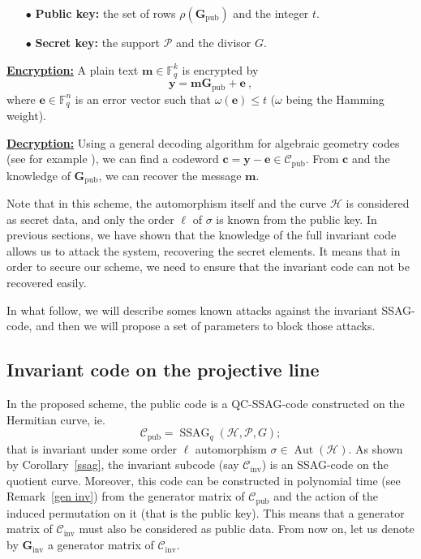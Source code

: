 \documentclass[10pt]{article}
\theoremstyle{definition}
\theoremstyle{definition}
\theoremstyle{definition}
\newcommand{\s}{\vspace{0.3cm}}
\newcommand{\C}{\mathcal{C}}
\newcommand{\fq}{\mathbb{F}_q}
\newcommand{\w}{\omega}
\newcommand{\PR}{\mathcal{P}}
\newcommand{\Aut}{\operatorname{Aut}}
\newcommand{\ssag}{\operatorname{SSAG}}
\begin{document}
\begin{enumerate}
\item[$\bullet$] \textbf{Public key:} the set of rows $\rho(\mathbf{G}_{\mathrm{pub}})$ and the integer $t$.
\item[$\bullet$] \textbf{Secret key:} the support $\PR$ and the divisor $G$.
\end{enumerate}

\s

\underline{\textbf{Encryption:}} A plain text $\mathbf{m} \in \fq^k$ is encrypted by 
\[ \mathbf{y}  = \mathbf{m}\mathbf{G}_{\mathrm{pub}} + \mathbf{e} \ ,\]
where $\mathbf{e} \in \fq^n$ is an error vector such that $\w(\mathbf{e}) \leq t$ ($\w$ being the Hamming weight).

\s

\underline{\textbf{Decryption:}} Using a general decoding algorithm for algebraic geometry codes (see for example \cite{THRP}), we can find a codeword $\mathbf{c} = \mathbf{y} - \mathbf{e} \in \mathcal{C}_{\mathrm{pub}}$. From $\mathbf{c}$ and the knowledge of $\mathbf{G}_{\mathrm{pub}}$, we can recover the message $\mathbf{m}$.

\s

Note that in this scheme, the automorphism itself and the curve $\mathcal{H}$ is considered as secret data, and only the order $\ell$ of $\sigma$ is known from the public key. In previous sections, we have shown that the knowledge of the full invariant code allows us to attack the system, recovering the secret elements. It means that in order to secure our scheme, we need to ensure that the invariant code can not be recovered easily. 

\s

In what follow, we will describe somes known attacks against the invariant SSAG-code, and then we will propose a set of parameters to block those attacks.

\s

\subsection{Invariant code on the projective line} \label{section6.2}

\s

In the proposed scheme, the public code is a QC-SSAG-code constructed on the Hermitian curve, ie. 
\[\mathcal{C}_{\mathrm{pub}} = \ssag_q(\mathcal{H},\PR,G);\]
that is invariant under some order $\ell$ automorphism $\sigma \in \Aut(\mathcal{H})$. As shown by Corollary~\ref{ssag}, the invariant subcode (say $\mathcal{C}_{\mathrm{inv}}$) is an SSAG-code on the quotient curve. Moreover, this code can be constructed in polynomial time (see Remark~\ref{gen inv}) from the generator matrix of $\mathcal{C}_{\mathrm{pub}}$ and the action of the induced permutation on it (that is the public key). This means that a generator matrix of $\C_{\mathrm{inv}}$ must also be considered as public data. From now on, let us denote by $\mathbf{G}_{\mathrm{inv}}$ a generator matrix of $\mathcal{C}_{\mathrm{inv}}$.  
\end{document}
